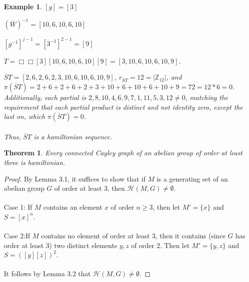\documentclass{article}
\newtheorem{theorem}{Theorem}
\newtheorem{example}{Example}
\begin{document}
\begin{example}
$[g] = [3]$

$(\overline{W})^{-1} = [10, 6, 10, 6, 10]$

$[g^{-1}]^{j-1} = [3^{-1}]^{2-1} = [9]$

$T = \Box \Box [3][10, 6, 10, 6, 10][9] = [3, 10, 6, 10, 6, 10, 9]$.

$\overline{S}T = [2, 6, 2, 6, 2, 3, 10, 6, 10, 6, 10, 9]$, $r_{\overline{S}T} = 12 = |\mathbb{Z}_{12}|$, and $\pi(\overline{S}T) =2+6+2+6+2+3+10+6+10+6+10+9 = 72 = 12*6 = 0$. Additionally, each partial is $2, 8, 10, 4, 6, 9, 7, 1, 11, 5, 3, 12\neq 0$, matching the requirement that each partial product is distinct and not identity zero, except the last on, which $\pi(\overline{S}T)=0$.

\paragraph{}
Thus, $\overline{S}T$ is a \textit{hamiltonian} sequence.
\end{example}

\begin{theorem}
    Every connected Cayley graph of an abelian group of order at least three is \textit{hamiltonian}.
\end{theorem}

\begin{proof}
    By Lemma 3.1, it suffices to show that if $M$ is a generating set of an abelian group $G$ of order at least 3, then $\mathcal{H}(M, G) \neq \emptyset$. 
    \paragraph{}
    Case 1: If $M$ contains an element $x$ of order $n \geq 3$, then let $M' = \{x\}$ and $S = [x]^n$. 
    \paragraph{}
    Case 2:If $M$ contains no element of order at least 3, then it contains (since $G$ has order at least 3) two distinct elements $y, z$ of order 2. Then let $M' = \{y, z\}$ and $S = ([y][z])^2$. 
    \paragraph{}
    It follows by Lemma 3.2 that $\mathcal{H}(M, G) \neq \emptyset$.
\end{proof}
\end{document}
